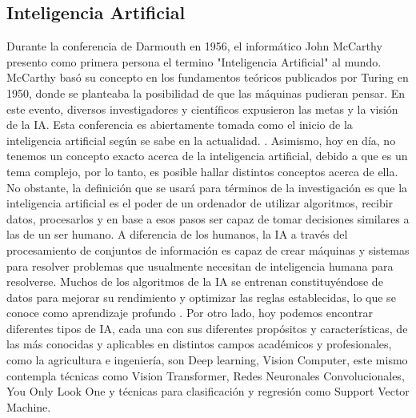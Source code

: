 \subsection{Inteligencia Artificial}
Durante la conferencia de Darmouth en 1956, el informático John McCarthy presento como primera persona el termino "Inteligencia Artificial" al mundo. McCarthy basó su concepto en los fundamentos teóricos publicados por Turing en 1950, donde se planteaba la posibilidad de que las máquinas pudieran pensar. En este evento, diversos investigadores y científicos expusieron las metas y la visión de la IA. Esta conferencia es abiertamente tomada como el inicio de la inteligencia artificial según se sabe en la actualidad. \parencite{teamredac2022}.
Asimismo, hoy en día, no tenemos un concepto exacto acerca de la inteligencia artificial, debido a que es un tema complejo, por lo tanto, es posible hallar distintos conceptos acerca de ella. No obstante, la definición que se usará para términos de la investigación es que la inteligencia artificial es el poder de un ordenador de utilizar algoritmos, recibir datos, procesarlos y en base a esos pasos ser capaz de tomar decisiones similares a las de un ser humano. A diferencia de los humanos, la IA a través del procesamiento de conjuntos de información es capaz de crear máquinas y sistemas para resolver problemas que usualmente necesitan de inteligencia humana para resolverse. Muchos de los algoritmos de la IA se entrenan constituyéndose de datos para mejorar su rendimiento y optimizar las reglas establecidas, lo que se conoce como aprendizaje profundo \parencites{rouhiainen2018inteligencia}{cajahuanca2021inteligencia}. 
Por otro lado, hoy podemos encontrar diferentes tipos de IA, cada una con sus diferentes propósitos y características, de las más conocidas y aplicables en distintos campos académicos y profesionales, como la agricultura e ingeniería, son  Deep learning,  Vision Computer, este mismo contempla técnicas como Vision Transformer, Redes Neuronales Convolucionales, You Only Look One y técnicas para clasificación y regresión como Support Vector Machine.

